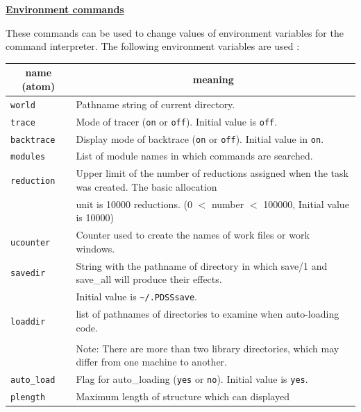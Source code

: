 \noindent\underline{\bf Environment commands}
\vspace{1ex}\par
These commands can be used to change values of environment variables
for the command interpreter. The following environment variables are used :
\vspace{1ex}
\begin{center}
\begin{tabular}{|l|l|}\hline
\multicolumn{1}{|c|}{name (atom)} & \multicolumn{1}{c|}{meaning}\\ \hline\hline
\verb|world| & {\small Pathname string of current directory.}\\
\hline
\verb|trace| & {\small Mode of tracer (\verb|on| or \verb|off|). 
					Initial value is \verb|off|.}\\
\hline
\verb|backtrace| & {\small Display mode of backtrace (\verb|on| or \verb|off|).
					 Initial value in \verb|on|.}\\
\hline
\verb|modules| & {\small List of module names in which commands are 
								searched.}\\
\hline
\verb|reduction| & {\small Upper limit of the number of reductions assigned
			 when the task was created. The basic allocation}\\
		& {\small unit is 10000 reductions.
			 (0 $<$ number $<$ 100000, Initial value is 10000)}\\
\hline
\verb|ucounter| & {\small Counter used to create the names of 
						work files or work windows.}\\
\hline
\verb|savedir| & {\small String with the pathname of directory in which
			save/1 and save_all will produce their effects.}\\
		& {\small Initial value is \verb|~/.PDSSsave|.}\\
\hline
\verb|loaddir| & {\small list of pathnames of directories to examine 
						when auto-loading code.}\\
& {\small Initial value is \verb|[~/.PDSSsave, pathname of library directory,
								 ...]|}\\
& {\small Note: There are more than two library directories, 
			which may differ from one machine to another.}\\
\hline
\verb|auto_load| & {\small Flag for auto_loading (\verb|yes| or \verb|no|).
					 Initial value is \verb|yes|.}\\
\hline
\verb|plength| & {\small Maximum length of structure which can displayed
}
\end{tabular}
\end{center}
